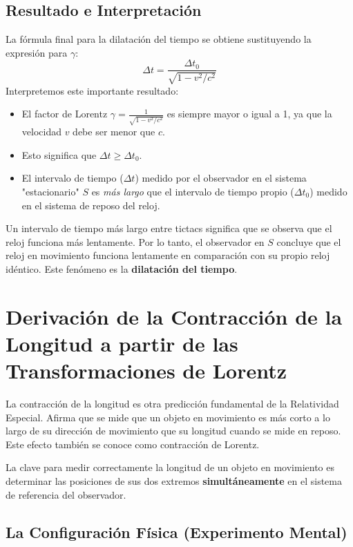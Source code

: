 \documentclass[11pt,a4paper]{article}
\begin{document}
\subsection{Resultado e Interpretación}

La fórmula final para la dilatación del tiempo se obtiene sustituyendo la expresión para $\gamma$:
\[ \boxed{ \Delta t = \frac{\Delta t_0}{\sqrt{1 - v^2/c^2}} } \]
Interpretemos este importante resultado:
\begin{itemize}
    \item El factor de Lorentz $\gamma = \frac{1}{\sqrt{1 - v^2/c^2}}$ es siempre mayor o igual a 1, ya que la velocidad $v$ debe ser menor que $c$.
    \item Esto significa que $\Delta t \ge \Delta t_0$.
    \item El intervalo de tiempo ($\Delta t$) medido por el observador en el sistema "estacionario" $S$ es \textit{más largo} que el intervalo de tiempo propio ($\Delta t_0$) medido en el sistema de reposo del reloj.
\end{itemize}
Un intervalo de tiempo más largo entre tictacs significa que se observa que el reloj funciona más lentamente. Por lo tanto, el observador en $S$ concluye que el reloj en movimiento funciona lentamente en comparación con su propio reloj idéntico. Este fenómeno es la \textbf{dilatación del tiempo}.


\section{Derivación de la Contracción de la Longitud a partir de las Transformaciones de Lorentz}

La contracción de la longitud es otra predicción fundamental de la Relatividad Especial. Afirma que se mide que un objeto en movimiento es más corto a lo largo de su dirección de movimiento que su longitud cuando se mide en reposo. Este efecto también se conoce como contracción de Lorentz.

La clave para medir correctamente la longitud de un objeto en movimiento es determinar las posiciones de sus dos extremos \textbf{simultáneamente} en el sistema de referencia del observador.

\subsection{La Configuración Física (Experimento Mental)}
\end{document}
